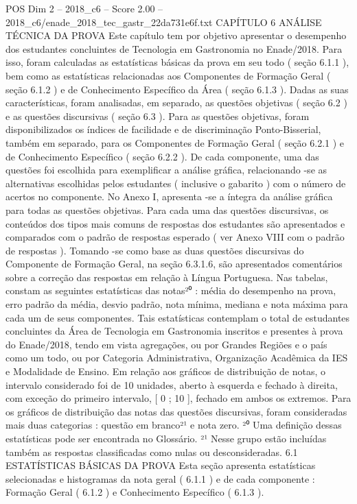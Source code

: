 \begin{textsample}{POS Dim 2 – 2018\_c6 – Score 2.00 – 2018\_c6/enade\_2018\_tec\_gastr\_22da731e6f.txt}  \label{ex:f2_pos_193}
CAPÍTULO 6 ANÁLISE TÉCNICA DA PROVA Este capítulo tem por objetivo apresentar o desempenho dos estudantes concluintes de Tecnologia em Gastronomia no Enade/2018.
Para isso, foram calculadas as estatísticas básicas da prova em seu todo ( seção 6.1.1 ), bem como as estatísticas relacionadas aos Componentes de Formação Geral ( seção 6.1.2 ) e de Conhecimento Específico da Área ( seção 6.1.3 ).
Dadas as suas características, foram analisadas, em separado, as questões objetivas ( seção 6.2 ) e as questões discursivas ( seção 6.3 ).
Para as questões objetivas, foram disponibilizados os índices de facilidade e de discriminação Ponto-Bisserial, também em separado, para os Componentes de Formação Geral ( seção 6.2.1 ) e de Conhecimento Específico ( seção 6.2.2 ).
De cada componente, uma das questões foi escolhida para exemplificar a análise gráfica, relacionando -se as alternativas escolhidas pelos estudantes ( inclusive o gabarito ) com o número de acertos no componente.
No Anexo I, apresenta -se a íntegra da análise gráfica para todas as questões objetivas.
Para cada uma das questões discursivas, os conteúdos dos tipos mais comuns de respostas dos estudantes são apresentados e comparados com o padrão de respostas esperado ( ver Anexo VIII com o padrão de respostas ).
Tomando -se como base as duas questões discursivas do Componente de Formação Geral, na seção 6.3.1.6, são apresentados comentários sobre a correção das respostas em relação à Língua Portuguesa.
Nas tabelas, constam as seguintes estatísticas das notas²⁰ : média do desempenho na prova, erro padrão da média, desvio padrão, nota mínima, mediana e nota máxima para cada um de seus componentes.
Tais estatísticas contemplam o total de estudantes concluintes da Área de Tecnologia em Gastronomia inscritos e presentes à prova do Enade/2018, tendo em vista agregações, ou por Grandes Regiões e o país como um todo, ou por Categoria Administrativa, Organização Acadêmica da IES e Modalidade de Ensino.
Em relação aos gráficos de distribuição de notas, o intervalo considerado foi de 10 unidades, aberto à esquerda e fechado à direita, com exceção do primeiro intervalo, [ 0 ; 10 ], fechado em ambos os extremos.
Para os gráficos de distribuição das notas das questões discursivas, foram consideradas mais duas categorias : questão em branco²¹ e nota zero. ²⁰ Uma definição dessas estatísticas pode ser encontrada no Glossário. ²¹ Nesse grupo estão incluídas também as respostas classificadas como nulas ou desconsideradas. 6.1 ESTATÍSTICAS BÁSICAS DA PROVA Esta seção apresenta estatísticas selecionadas e histogramas da nota geral ( 6.1.1 ) e de cada componente : Formação Geral ( 6.1.2 ) e Conhecimento Específico ( 6.1.3 ).

\end{textsample}
